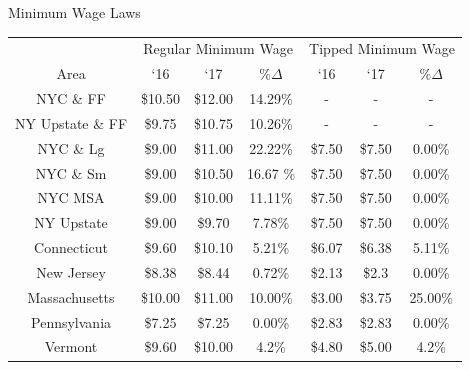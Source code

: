 \documentclass[xcolor=table]{beamer}
\begin{document}
\begin{spacing}{1.2}
\begin{frame}[label=main]{Minimum Wage Laws}
\footnotesize
\centering
\begin{tabular}{ c c c c c c c} \\ \hline \hline
&  \multicolumn{3}{c}{Regular Minimum Wage} & \multicolumn{3}{c}{Tipped Minimum Wage}\\
 Area & `16  & `17  & $\% \Delta$ & `16 & `17 &  $\% \Delta$  \\ \hline \hline
 NYC \& FF & \$10.50 & \$12.00 & 14.29\%& - & - & - \\
 NY Upstate \& FF  & \$9.75 & \$10.75 & 10.26\% & - & -& - \\
NYC \& Lg & \$9.00 & \$11.00 & 22.22\% & \$7.50 & \$7.50 & 0.00\%\\
NYC \& Sm & \$9.00 & \$10.50 & 16.67 \% & \$7.50 & \$7.50 & 0.00\%\\
NYC MSA & \$9.00 & \$10.00 & 11.11\% & \$7.50 & \$7.50 & 0.00\%\\
NY Upstate & \$9.00 & \$9.70 & 7.78\% & \$7.50 & \$7.50  & 0.00\% \\
\rowcolor{yellow}Connecticut & \$9.60 & \$10.10 & 5.21\% & \$6.07 & \$6.38 & 5.11\% \\
\rowcolor{yellow}New Jersey &  \$8.38 & \$8.44 & 0.72\%  & \$2.13 & \$2.3 & 0.00\% \\
\rowcolor{yellow} Massachusetts & \$10.00 & \$11.00 & 10.00\% & \$3.00 & \$3.75  & 25.00\% \\
\rowcolor{yellow}Pennsylvania &  \$7.25 & \$7.25 & 0.00\% & \$2.83 & \$2.83 & 0.00\% \\
\rowcolor{yellow}Vermont &  \$9.60 & \$10.00 & 4.2\% & \$4.80 & \$5.00 & 4.2\% \\
\end{tabular}
\raggedleft
\hyperlink{supplemental}{}
\end{frame}


\end{spacing}
\end{document}
